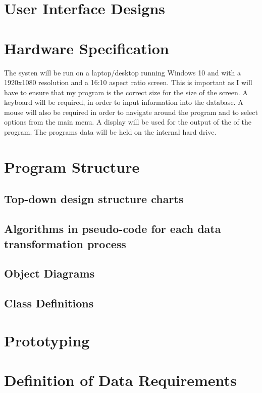 \section{User Interface Designs}

\section{Hardware Specification}
The systen will be run on a laptop/desktop running Windows 10 and with a 1920x1080 resolution and a 16:10 aspect ratio screen. This is important as I will have to ensure that my program is the correct size for the size of the screen. A keyboard will be required, in order to input information into the database. A mouse will also be required in order to navigate around the program and to select options from the main menu. A display will be used for the output of the of the program. The programs data will be held on the internal hard drive.
\section{Program Structure}

\subsection{Top-down design structure charts}

\subsection{Algorithms in pseudo-code for each data transformation process}

\subsection{Object Diagrams}

\subsection{Class Definitions}

\section{Prototyping}

\section{Definition of Data Requirements}

